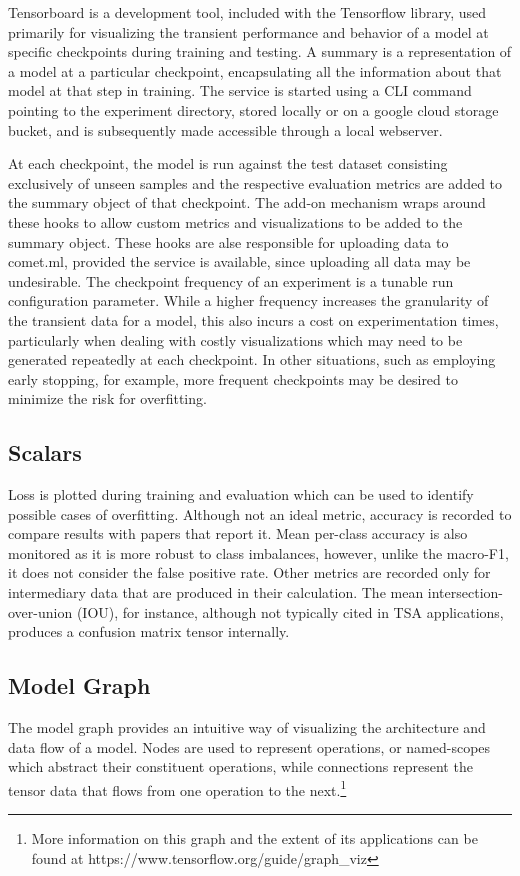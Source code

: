 \documentclass[../../fyp.tex]{subfiles}
\begin{document}
Tensorboard is a development tool, included with the Tensorflow library, used primarily for visualizing the transient performance and behavior of a model at specific checkpoints during training and testing. A summary is a representation of a model at a particular checkpoint, encapsulating all the information about that model at that step in training. The service is started using a CLI command pointing to the experiment directory, stored locally or on a google cloud storage bucket, and is subsequently made accessible through a local webserver.   

At each checkpoint, the model is run against the test dataset consisting exclusively of unseen samples and the respective evaluation metrics are added to the summary object of that checkpoint. The add-on mechanism wraps around these hooks to allow custom metrics and visualizations to be added to the summary object. These hooks are alse responsible for uploading data to comet.ml, provided the service is available, since uploading all data may be undesirable. The checkpoint frequency of an experiment is a tunable run configuration parameter. While a higher frequency increases the granularity of the transient data for a model, this also incurs a cost on experimentation times, particularly when dealing with costly visualizations which may need to be generated repeatedly at each checkpoint. In other situations, such as employing early stopping, for example, more frequent checkpoints may be desired to minimize the risk for overfitting.

\subsection{Scalars}
Loss is plotted during training and evaluation which can be used to identify possible cases of overfitting. Although not an ideal metric, accuracy is recorded to compare results with papers that report it. Mean per-class accuracy is also monitored as it is more robust to class imbalances, however, unlike the macro-F1, it does not consider the false positive rate. Other metrics are recorded only for intermediary data that are produced in their calculation. The mean intersection-over-union (IOU), for instance, although not typically cited in TSA applications, produces a confusion matrix tensor internally.

\subsection{Model Graph}
The model graph provides an intuitive way of visualizing the architecture and data flow of a model. Nodes are used to represent operations, or named-scopes which abstract their constituent operations, while connections represent the tensor data that flows from one operation to the next.\footnote{More information on this graph and the extent of its applications can be found at https://www.tensorflow.org/guide/graph\_viz} 
\end{document}
